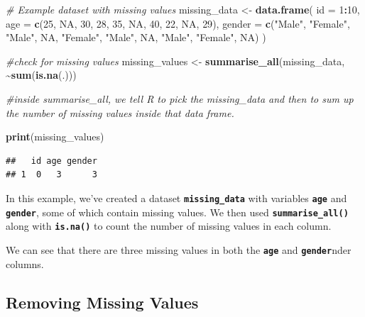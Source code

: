\documentclass[
]{book}
\newenvironment{Shaded}{\begin{snugshade}}{\end{snugshade}}
\newcommand{\AttributeTok}[1]{\textcolor[rgb]{0.13,0.29,0.53}{#1}}
\newcommand{\CommentTok}[1]{\textcolor[rgb]{0.56,0.35,0.01}{\textit{#1}}}
\newcommand{\ConstantTok}[1]{\textcolor[rgb]{0.56,0.35,0.01}{#1}}
\newcommand{\DecValTok}[1]{\textcolor[rgb]{0.00,0.00,0.81}{#1}}
\newcommand{\FunctionTok}[1]{\textcolor[rgb]{0.13,0.29,0.53}{\textbf{#1}}}
\newcommand{\NormalTok}[1]{#1}
\newcommand{\OtherTok}[1]{\textcolor[rgb]{0.56,0.35,0.01}{#1}}
\newcommand{\SpecialCharTok}[1]{\textcolor[rgb]{0.81,0.36,0.00}{\textbf{#1}}}
\newcommand{\StringTok}[1]{\textcolor[rgb]{0.31,0.60,0.02}{#1}}
\begin{document}
\begin{Shaded}
\begin{Highlighting}[]
\CommentTok{\# Example dataset with missing values}
\NormalTok{missing\_data }\OtherTok{\textless{}{-}} \FunctionTok{data.frame}\NormalTok{(}
  \AttributeTok{id =} \DecValTok{1}\SpecialCharTok{:}\DecValTok{10}\NormalTok{,}
  \AttributeTok{age =} \FunctionTok{c}\NormalTok{(}\DecValTok{25}\NormalTok{, }\ConstantTok{NA}\NormalTok{, }\DecValTok{30}\NormalTok{, }\DecValTok{28}\NormalTok{, }\DecValTok{35}\NormalTok{, }\ConstantTok{NA}\NormalTok{, }\DecValTok{40}\NormalTok{, }\DecValTok{22}\NormalTok{, }\ConstantTok{NA}\NormalTok{, }\DecValTok{29}\NormalTok{),}
  \AttributeTok{gender =} \FunctionTok{c}\NormalTok{(}\StringTok{"Male"}\NormalTok{, }\StringTok{"Female"}\NormalTok{, }\StringTok{"Male"}\NormalTok{, }\ConstantTok{NA}\NormalTok{, }\StringTok{"Female"}\NormalTok{, }\StringTok{"Male"}\NormalTok{, }\ConstantTok{NA}\NormalTok{, }\StringTok{"Male"}\NormalTok{, }\StringTok{"Female"}\NormalTok{, }\ConstantTok{NA}\NormalTok{)}
\NormalTok{)}

\CommentTok{\#check for missing values}
\NormalTok{missing\_values }\OtherTok{\textless{}{-}} \FunctionTok{summarise\_all}\NormalTok{(missing\_data, }\SpecialCharTok{\textasciitilde{}}\FunctionTok{sum}\NormalTok{(}\FunctionTok{is.na}\NormalTok{(.)))}

\CommentTok{\#inside summarise\_all, we tell R to pick the missing\_data and then to sum up the number of missing values inside that data frame. }

\FunctionTok{print}\NormalTok{(missing\_values)}
\end{Highlighting}
\end{Shaded}

\begin{verbatim}
##   id age gender
## 1  0   3      3
\end{verbatim}

In this example, we've created a dataset \textbf{\texttt{missing\_data}} with variables \textbf{\texttt{age}} and \textbf{\texttt{gender}}, some of which contain missing values. We then used \textbf{\texttt{summarise\_all()}} along with \textbf{\texttt{is.na()}} to count the number of missing values in each column.

We can see that there are three missing values in both the \textbf{\texttt{age}} and \textbf{\texttt{gender}}nder columns.

\hypertarget{removing-missing-values}{%
\subsection{Removing Missing Values}\label{removing-missing-values}}
\end{document}
